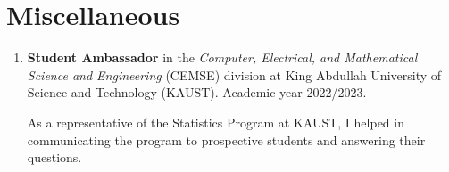 \documentclass[10pt, ]{article}
\begin{document}
	\noindent\makebox[\linewidth]{\rule{\paperwidth}{0.5pt}}

	\vspace{-12pt}
	\section*{Miscellaneous} \vspace{-5pt}
	
	\begin{enumerate}[noitemsep, topsep=0pt]
		\item \textbf{Student Ambassador} in the\textit{ Computer, Electrical,  and Mathematical Science and Engineering} (CEMSE) division at King Abdullah University of Science and Technology (KAUST). Academic year 2022/2023.
		
		As a representative of the Statistics Program at KAUST, I helped in communicating the program to prospective students and answering their questions.
	\end{enumerate}
	
\end{document}

